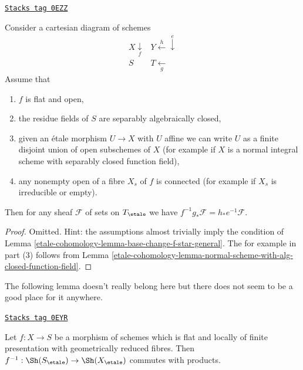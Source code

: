 \begin{lemma}
\label{etale-cohomology-lemma-base-change-f-star-valuation}
\href{https://stacks.math.columbia.edu/tag/0EZZ}{\texttt{Stacks tag 0EZZ}}

Consider a cartesian diagram of schemes
$$
\begin{array}{cc}X \underset{f}{\downarrow} & Y \overset{h}{\longleftarrow}\overset{e}{\downarrow} \\ S & T \underset{g}{\longleftarrow}\end{array}
$$
Assume that
\begin{enumerate}
\item $f$ is flat and open,
\item the residue fields of $S$ are separably algebraically closed,
\item given an \'etale morphism $U \to X$ with $U$ affine
we can write $U$ as a finite disjoint union of open subschemes
of $X$ (for example if $X$ is a normal integral scheme
with separably closed function field),
\item any nonempty open of a fibre $X_s$ of $f$ is connected
(for example if $X_s$ is irreducible or empty).
\end{enumerate}
Then for any sheaf $\mathcal{F}$ of sets on $T_\etale$ we have
$f^{-1}g_*\mathcal{F} = h_*e^{-1}\mathcal{F}$.
\end{lemma}

\begin{proof}
Omitted. Hint: the assumptions almost trivially imply
the condition of Lemma \ref{etale-cohomology-lemma-base-change-f-star-general}.
The for example in part (3) follows from
Lemma \ref{etale-cohomology-lemma-normal-scheme-with-alg-closed-function-field}.
\end{proof}

The following lemma doesn't really belong here but there does not
seem to be a good place for it anywhere.

\begin{lemma}
\label{etale-cohomology-lemma-fppf-reduced-fibres-pullback-products}
\href{https://stacks.math.columbia.edu/tag/0EYR}{\texttt{Stacks tag 0EYR}}

Let $f : X \to S$ be a morphism of schemes which is flat and
locally of finite presentation with geometrically reduced fibres.
Then $f^{-1} : \Sh(S_\etale) \to \Sh(X_\etale)$ commutes
with products.
\end{lemma}

